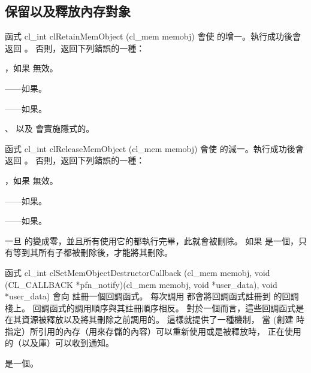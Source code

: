 \subsection{保留以及釋放內存對象}

函式
\startclc
cl_int clRetainMemObject (cl_mem memobj)
\stopclc
會使  的增一。執行成功後會返回 。
否則，返回下列錯誤的一種：
\startigBase
\item {}，如果  無效。

\item {}——如果\scdevfailres。

\item {}——如果\schostfailres。
\stopigBase

、  以及  會實施隱式的。

函式
\startclc
cl_int clReleaseMemObject (cl_mem memobj)
\stopclc
會使  的減一。執行成功後會返回 。
否則，返回下列錯誤的一種：
\startigBase
\item {}，如果  無效。

\item {}——如果\scdevfailres。

\item {}——如果\schostfailres。
\stopigBase

一旦  的變成零，並且所有使用它的都執行完畢，此就會被刪除。
如果  是一個，只有等到其所有子都被刪除後，才能將其刪除。

函式
\startclc
cl_int clSetMemObjectDestructorCallback (cl_mem memobj,
		void (CL_CALLBACK *pfn_notify)(cl_mem memobj,
			void *user_data),
		void *user_data)
\stopclc
會向  註冊一個回調函式。
每次調用  都會將回調函式註冊到  的回調棧上。
回調函式的調用順序與其註冊順序相反。
對於一個而言，這些回調函式是在其資源被釋放以及將其刪除之前調用的。
這樣就提供了一種機制，
當  (創建  時指定）所引用的內存（用來存儲的內容）可以重新使用或是被釋放時，
正在使用  的（以及庫）可以收到通知。

 是一個。

